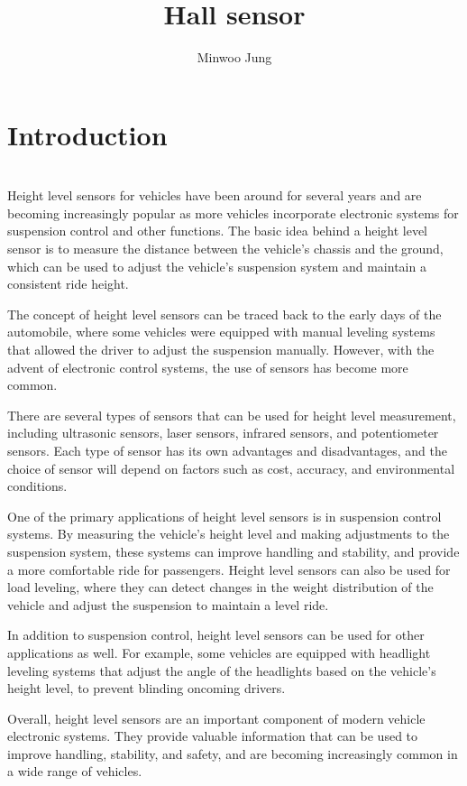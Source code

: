 \documentclass[11pt]{article}
\title{Hall sensor}
\author{Minwoo Jung}
\begin{document}
\maketitle

\section{Introduction}
\indent \\Height level sensors for vehicles have been around for several years and are becoming increasingly popular as more vehicles incorporate electronic systems for suspension control and other functions. The basic idea behind a height level sensor is to measure the distance between the vehicle's chassis and the ground, which can be used to adjust the vehicle's suspension system and maintain a consistent ride height.

The concept of height level sensors can be traced back to the early days of the automobile, where some vehicles were equipped with manual leveling systems that allowed the driver to adjust the suspension manually. However, with the advent of electronic control systems, the use of sensors has become more common.

There are several types of sensors that can be used for height level measurement, including ultrasonic sensors, laser sensors, infrared sensors, and potentiometer sensors. Each type of sensor has its own advantages and disadvantages, and the choice of sensor will depend on factors such as cost, accuracy, and environmental conditions.

One of the primary applications of height level sensors is in suspension control systems. By measuring the vehicle's height level and making adjustments to the suspension system, these systems can improve handling and stability, and provide a more comfortable ride for passengers. Height level sensors can also be used for load leveling, where they can detect changes in the weight distribution of the vehicle and adjust the suspension to maintain a level ride.

In addition to suspension control, height level sensors can be used for other applications as well. For example, some vehicles are equipped with headlight leveling systems that adjust the angle of the headlights based on the vehicle's height level, to prevent blinding oncoming drivers.

Overall, height level sensors are an important component of modern vehicle electronic systems. They provide valuable information that can be used to improve handling, stability, and safety, and are becoming increasingly common in a wide range of vehicles.
\end{document}
